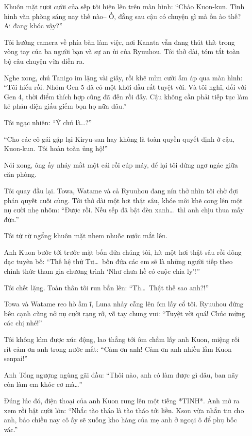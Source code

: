 \documentclass[../main.tex]{subfiles}
\begin{document}
Khuôn mặt tươi cười của sếp tôi hiện lên trên màn hình: ``Chào Kuon-kun. Tình hình văn phòng sáng nay thế nào-- Ồ, đằng sau cậu có chuyện gì mà ồn ào thế? Ai đang khóc vậy?''

Tôi hướng camera về phía bàn làm việc, nơi Kanata vẫn đang thút thít trong vòng tay của ba người bạn và sự an ủi của Ryuuhou. Tôi thở dài, tóm tắt toàn bộ câu chuyện vừa diễn ra.

Nghe xong, chú Tanigo im lặng vài giây, rồi khẽ mỉm cười ấm áp qua màn hình: ``Tôi hiểu rồi. Nhóm Gen 5 đã có một khởi đầu rất tuyệt vời. Và tôi nghĩ, đối với Gen 4, thời điểm thích hợp cũng đã đến rồi đấy. Cậu không cần phải tiếp tục làm kẻ phản diện giấu giếm bọn họ nữa đâu.''

Tôi ngạc nhiên: ``Ý chú là\dots?''

``Cho các cô gái gặp lại Kiryu-san hay không là toàn quyền quyết định ở cậu, Kuon-kun. Tôi hoàn toàn ủng hộ!''

Nói xong, ông ấy nháy mắt một cái rồi cúp máy, để lại tôi đứng ngơ ngác giữa căn phòng.

Tôi quay đầu lại. Towa, Watame và cả Ryuuhou đang nín thở nhìn tôi chờ đợi phán quyết cuối cùng. Tôi thở dài một hơi thật sâu, khóe môi khẽ cong lên một nụ cười nhẹ nhõm: ``Được rồi. Nếu sếp đã bật đèn xanh\dots\ thì anh chịu thua mấy đứa.''


Tôi từ từ ngẩng khuôn mặt nhem nhuốc nước mắt lên.

Anh Kuon bước tới trước mặt bốn đứa chúng tôi, hít một hơi thật sâu rồi dõng dạc tuyên bố: ``Thế hệ thứ Tư\dots\ bốn đứa các em sẽ là những người tiếp theo chính thức tham gia chương trình `Như chưa hề có cuộc chia ly'!''

Tôi chết lặng. Toàn thân tôi run bắn lên: ``Th\dots\ Thật thế sao anh?!''

Towa và Watame reo hò ầm ĩ, Luna nhảy cẫng lên ôm lấy cổ tôi. Ryuuhou đứng bên cạnh cũng nở nụ cười rạng rỡ, vỗ tay chung vui: ``Tuyệt vời quá! Chúc mừng các chị nhé!''

Tôi không kìm được xúc động, lao thẳng tới ôm chầm lấy anh Kuon, miệng rối rít cảm ơn anh trong nước mắt: ``Cảm ơn anh! Cảm ơn anh nhiều lắm Kuon-senpai!''

Anh Tổng ngượng ngùng gãi đầu: ``Thôi nào, anh có làm được gì đâu, ban nãy còn làm em khóc cơ mà\dots''

Đúng lúc đó, điện thoại của anh Kuon rung lên một tiếng *TINH*. Anh mở ra xem rồi bật cười lớn: ``Nhắc tào tháo là tào tháo tới liền. Kson vừa nhắn tin cho anh, bảo chiều nay cô ấy sẽ xuống kho hàng của mẹ anh ở ngoại ô để phụ bốc vác.''
\end{document}
